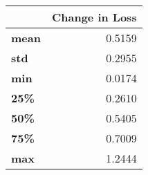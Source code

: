 \begin{tabular}{lr}
\toprule
{} &  Change in Loss \\
\midrule
\textbf{mean} &          0.5159 \\
\textbf{std } &          0.2955 \\
\textbf{min } &          0.0174 \\
\textbf{25\% } &          0.2610 \\
\textbf{50\% } &          0.5405 \\
\textbf{75\% } &          0.7009 \\
\textbf{max } &          1.2444 \\
\bottomrule
\end{tabular}
